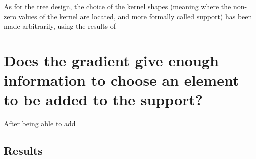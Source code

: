 As for the tree design, the choice of the kernel shapes (meaning where the non-zero values of the kernel are located, and more formally called support) has been made arbitrarily, using the results of \cite{chabiron_toward_2015}




\section{Does the gradient give enough information to choose an element to be added to the support?}

After being able to add
\subsection{Results}
